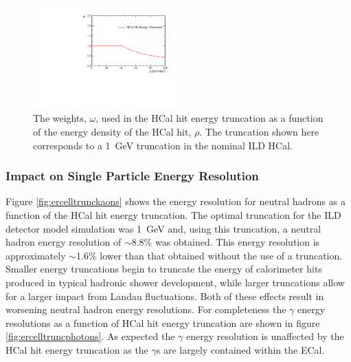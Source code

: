 \begin{figure}[h!]
\includegraphics[width=0.5\textwidth]{EnergyEstimators/Plots/SoftComp/Weights/CellTruncWeights.pdf}
\caption[The weights, $\omega$, used in the HCal hit energy truncation as a function of the energy density of the HCal hit, $\rho$.  The truncation shown here corresponds to a 1~GeV truncation in the nominal ILD HCal.]{The weights, $\omega$, used in the HCal hit energy truncation as a function of the energy density of the HCal hit, $\rho$.  The truncation shown here corresponds to a 1~GeV truncation in the nominal ILD HCal.}
\label{fig:hcalcellweight}
\end{figure}


\subsubsection{Impact on Single Particle Energy Resolution}
Figure \ref{fig:ercelltrunckaons} shows the energy resolution for neutral hadrons as a function of the HCal hit energy truncation.  The optimal truncation for the ILD detector model simulation was 1~GeV and, using this truncation, a neutral hadron energy resolution of $\sim$8.8\% was obtained.  This energy resolution is approximately $\sim$1.6\% lower than that obtained without the use of a truncation.  Smaller energy truncations begin to truncate the energy of calorimeter hits produced in typical hadronic shower development, while larger truncations allow for a larger impact from Landau fluctuations.  Both of these effects result in worsening neutral hadron energy resolutions.  For completeness the $\gamma$ energy resolutions as a function of HCal hit energy truncation are shown in figure \ref{fig:ercelltruncphotons}.  As expected the $\gamma$ energy resolution is unaffected by the HCal hit energy truncation as the $\gamma$s are largely contained within the ECal.

